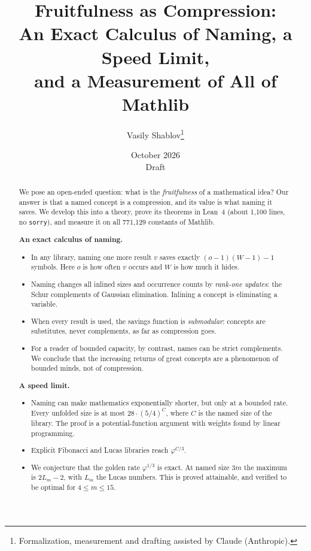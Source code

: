 \documentclass[11pt]{article}
\title{Fruitfulness as Compression:\\
An Exact Calculus of Naming, a Speed Limit,\\ and a Measurement of All of Mathlib}
\author{Vasily Shablov\thanks{Formalization, measurement and drafting assisted by Claude (Anthropic).}}
\date{October 2026 \\ \small Draft}
\theoremstyle{remark}
\newcommand{\lean}[1]{\texttt{#1}}
\begin{document}
\maketitle

\begin{abstract}
We pose an open-ended question: what is the \emph{fruitfulness} of a mathematical idea?
Our answer is that a named concept is a compression, and its value is what naming it saves.
We develop this into a theory, prove its theorems in Lean~4 (about 1{,}100 lines, no
\lean{sorry}), and measure it on all 771{,}129 constants of Mathlib.

\textbf{An exact calculus of naming.}
\begin{itemize}
\item In any library, naming one more result $v$ saves exactly $(o-1)(W-1)-1$ symbols.
  Here $o$ is how often $v$ occurs and $W$ is how much it hides.
\item Naming changes all inlined sizes and occurrence counts by \emph{rank-one updates}:
  the Schur complements of Gaussian elimination. Inlining a concept is eliminating a
  variable.
\item When every result is used, the savings function is \emph{submodular}: concepts are
  substitutes, never complements, as far as compression goes.
\item For a reader of bounded capacity, by contrast, names can be strict complements. We
  conclude that the increasing returns of great concepts are a phenomenon of bounded
  minds, not of compression.
\end{itemize}

\textbf{A speed limit.}
\begin{itemize}
\item Naming can make mathematics exponentially shorter, but only at a bounded rate. Every
  unfolded size is at most $28\cdot(5/4)^{C}$, where $C$ is the named size of the library.
  The proof is a potential-function argument with weights found by linear programming.
\item Explicit Fibonacci and Lucas libraries reach $\varphi^{C/3}$.
\item We conjecture that the golden rate $\varphi^{1/3}$ is exact. At named size $3m$ the
  maximum is $2L_m-2$, with $L_m$ the Lucas numbers. This is proved attainable, and
  verified to be optimal for $4\le m\le 15$.
\end{itemize}


\end{abstract}
\end{document}
